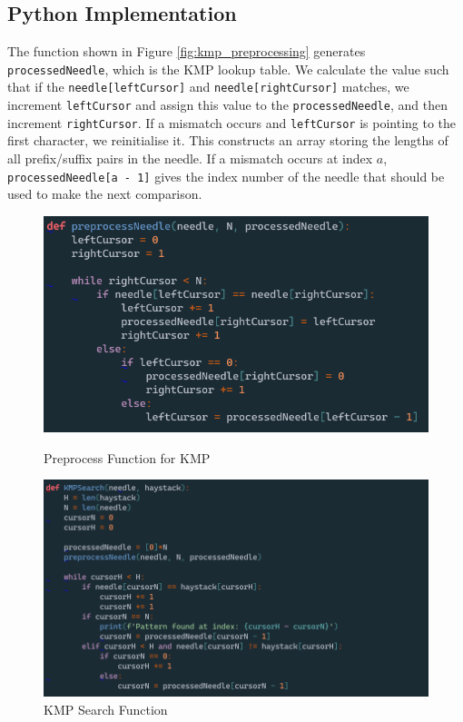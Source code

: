 \subsection*{Python Implementation}

The function shown in Figure \ref{fig:kmp_preprocessing} generates \texttt{processedNeedle}, which is the KMP lookup table. We calculate the value such that if the \texttt{needle[leftCursor]} and \texttt{needle[rightCursor]} matches, we increment \texttt{leftCursor} and assign this value to the \texttt{processedNeedle}, and then increment \texttt{rightCursor}. If a mismatch occurs and \texttt{leftCursor} is pointing to the first character, we reinitialise it. This constructs an array storing the lengths of all prefix/suffix pairs in the needle. If a mismatch occurs at index $a$, \texttt{processedNeedle[a - 1]} gives the index number of the needle that should be used to make the next comparison. 

\begin{figure}[H]
  \centering
  \begin{minipage}[b]{0.49\textwidth}
    \includegraphics[width=\textwidth]{images/preprocessKMP.png}
    \caption{Preprocess Function for KMP}
    \label{fig:kmp_preprocessing}
  \end{minipage}
  \hfill
  \begin{minipage}[b]{0.49\textwidth}
    \includegraphics[width=\textwidth]{images/KMP.png}
    \caption{KMP Search Function}
    \label{fig:kmp_search}
  \end{minipage}
\end{figure}

